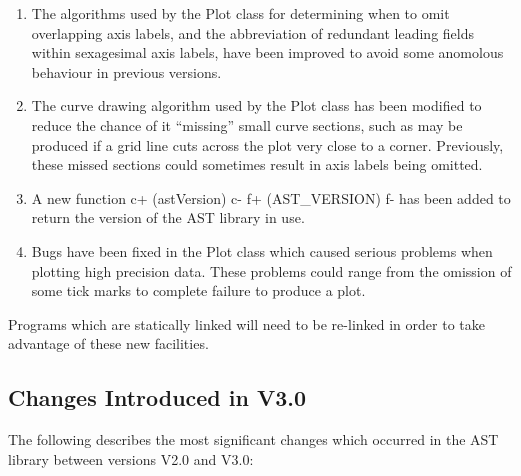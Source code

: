 \documentclass[twoside,11pt]{starlink}
\begin{document}
\begin{enumerate}
\item The algorithms used by the Plot class for determining when to omit
overlapping axis labels, and the abbreviation of redundant leading fields
within sexagesimal axis labels, have been improved to avoid some anomolous
behaviour in previous versions.

\item The curve drawing algorithm used by the Plot class has been
modified to reduce the chance of it ``missing'' small curve sections,
such as may be produced if a grid line cuts across the plot very close to
a corner. Previously, these missed sections could sometimes result in
axis labels being omitted.

\item A new function
c+
(astVersion)
c-
f+
(AST\_VERSION)
f-
has been added to return the version of the AST library in use.

\item Bugs have been fixed in the Plot class which caused serious problems
when plotting high precision data. These problems could range from the
omission of some tick marks to complete failure to produce a plot.

\end{enumerate}

Programs which are statically linked will need to be re-linked in
order to take advantage of these new facilities.


\subsection{Changes Introduced in V3.0}

The following describes the most significant changes which
occurred in the AST library between versions V2.0 and V3.0:
\end{document}
